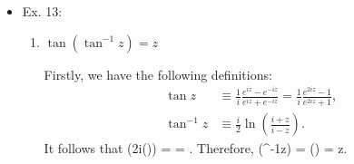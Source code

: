 \documentclass[10pt, letterpaper]{article}
\newcommand{\pd}[2]{\frac{\partial #1}{\partial #2}}
\begin{document}
\begin{itemize}
	Firstly, let's write $z=re^{i\theta}$. 
	\begin{enumerate}
		\item $\log z$:

		With the definition of $z$ in polar form, we have
		\be
			\log z = \log r + i\theta \equiv u(r, \theta) + iv(r, \theta). \nonumber
		\ee
		It is straightforward to show that
		\begin{align}
			\pd{u}{r} &= \frac{1}{r} = \frac{1}{r}\pd{v}{\theta},\nonumber\\
			\pd{v}{r} &= 0 = -\frac{1}{r}\pd{u}{\theta}. \nonumber
		\end{align}

		\item $z^{1/2}$:
		\be
			z^{1/2} = r^{1/2} e^{i\theta/2} = r^{1/2}\cos{} + ir^{1/2}\sin{} 
			= u(r, \theta) + iv(r, \theta) \nonumber
		\ee
		Thus, following the definition of polar Cauchy-Riemann conditions:
		\begin{align}
			\pd{u}{r} &= \frac{1}{2}r^{-1/2}\cos\frac{\theta}{2} = \frac{1}{r}\pd{v}{\theta}, \nonumber\\
			\pd{v}{r} &= \frac{1}{2}r^{-1/2}\sin\frac{\theta}{2} = -\frac{1}{r}\pd{u}{\theta}. \nonumber
		\end{align}

		\item $z^{1/3}$:
		\be
			z^{1/3} = r^{1/3} e^{i\theta/3} = r^{1/3}\cos{} + ir^{1/3}\sin{} 
			= u(r, \theta) + iv(r, \theta) \nonumber
		\ee
		Thus
		\begin{align}
			\pd{u}{r} &= \frac{1}{3}r^{-2/3}\cos\frac{\theta}{3} = \frac{1}{r}\pd{v}{\theta}, \nonumber\\
			\pd{v}{r} &= \frac{1}{3}r^{-2/3}\sin\frac{\theta}{3} = -\frac{1}{r}\pd{u}{\theta}. \nonumber
		\end{align}		

	\end{enumerate}
	In all the three cases, $z\neq 0$, i.e. $r\neq 0$.

	\item Ex. 13:
	\begin{enumerate}
		\item $\tan(\tan^{-1}z) = z$

		Firstly, we have the following definitions:
		\begin{align}
			\tan z      &\equiv \frac{1}{i}\frac{e^{iz}-e^{-iz}}{e^{iz}+e^{-iz}} 
			            = \frac{1}{i}\frac{e^{2iz}-1}{e^{2iz}+1}, \nonumber\\
			\tan^{-1} z &\equiv \frac{i}{2}\ln\left(\frac{i+z}{i-z}\right). \nonumber
		\end{align}
		It follows that
		\be
			\exp\left(2i\cdot{}\ln\left(\right)\right)
			= \exp{} \nonumber
			= .
		\ee
		Therefore,
		\be
			\tan(\tan^{-1}z) = \left(\right) = z.
			\nonumber
		\ee


\end{enumerate}
\end{itemize}
\end{document}
